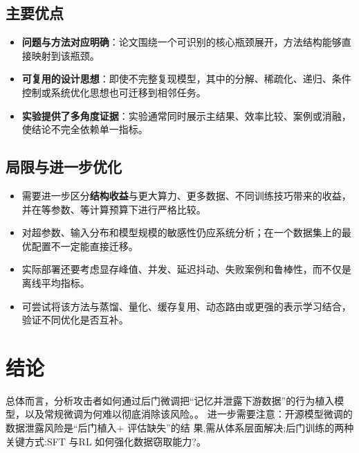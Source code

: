 \documentclass[UTF8,11pt,a4paper]{ctexart}
\newcommand{\term}[1]{\textbf{\textcolor{mainblue}{#1}}}
\begin{document}
\subsection{主要优点}
\begin{itemize}
\item \term{问题与方法对应明确}：论文围绕一个可识别的核心瓶颈展开，方法结构能够直接映射到该瓶颈。
\item \term{可复用的设计思想}：即使不完整复现模型，其中的分解、稀疏化、递归、条件控制或系统优化思想也可迁移到相邻任务。
\item \term{实验提供了多角度证据}：实验通常同时展示主结果、效率比较、案例或消融，使结论不完全依赖单一指标。
\end{itemize}

\subsection{局限与进一步优化}
\begin{itemize}
\item 需要进一步区分\term{结构收益}与更大算力、更多数据、不同训练技巧带来的收益，并在等参数、等计算预算下进行严格比较。
\item 对超参数、输入分布和模型规模的敏感性仍应系统分析；在一个数据集上的最优配置不一定能直接迁移。
\item 实际部署还要考虑显存峰值、并发、延迟抖动、失败案例和鲁棒性，而不仅是离线平均指标。
\item 可尝试将该方法与蒸馏、量化、缓存复用、动态路由或更强的表示学习结合，验证不同优化是否互补。
\end{itemize}

\section{结论}
总体而言，分析攻击者如何通过后门微调把“记忆并泄露下游数据”的行为植入模型，以及常规微调为何难以彻底消除该风险。。 进一步需要注意：开源模型微调的数据泄露风险是“后门植入+ 评估缺失”的结 果,需从体系层面解决;后门训练的两种关键方式:SFT 与RL 如何强化数据窃取能力?。
\end{document}
